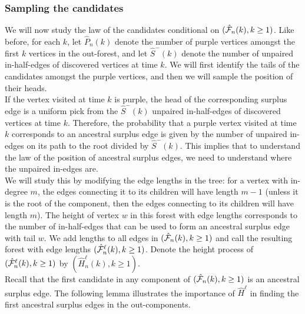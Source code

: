 \subsubsection{Sampling the candidates}\label{subsubsec.samplecandidates}
We will now study the law of the candidates conditional on $(\hat{{\mathcal F}}_n(k),k\geq 1)$. Like before, for each $k$, let $\hat{P}_n(k)$ denote the number of purple vertices amongst the first $k$ vertices in the out-forest, and let $\hat{S}^-(k)$ denote the number of unpaired in-half-edges of discovered vertices at time $k$. We will first identify the tails of the candidates amongst the purple vertices, and then we will sample the position of their heads. \\
If the vertex visited at time $k$ is purple, the head of the corresponding surplus edge is a uniform pick from the $\hat{S}^-(k)$ unpaired in-half-edges of discovered vertices at time $k$. Therefore, the probability that a purple vertex visited at time $k$ corresponds to an ancestral surplus edge is given by the number of unpaired in-edges on its path to the root divided by $\hat{S}^-(k)$. This implies that to understand the law of the position of ancestral surplus edges, we need to understand where the unpaired in-edges are. \\
We will study this by modifying the edge lengths in the tree: for a vertex with in-degree $m$, the edges connecting it to its children will have length $m-1$ (unless it is the root of the component, then the edges connecting to its children will have length $m$). The height of vertex $w$ in this forest with edge lengths corresponds to the number of in-half-edges that can be used to form an ancestral surplus edge with tail $w$. We add lengths to all edges in $(\hat{{\mathcal F}}_n(k),k\geq 1)$ and call the resulting forest with edge lengths $(\hat{{\mathcal F}}^\ell_n(k),k\geq 1)$. Denote the height process of $(\hat{{\mathcal F}}^\ell_n(k),k\geq 1)$ by $(\hat{H}_n^\ell(k),k\geq 1)$. \\
Recall that the first candidate in any component of $(\hat{{\mathcal F}}_n(k),k\geq 1)$ is an ancestral surplus edge. The following lemma illustrates the importance of $\hat{H}^\ell$ in finding the first ancestral surplus edges in the out-components.

